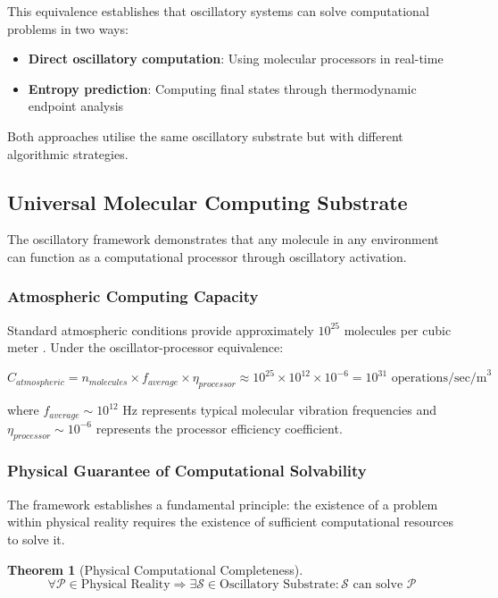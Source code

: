 \documentclass[12pt,a4paper]{article}
\newtheorem{theorem}{Theorem}
\begin{document}
This equivalence establishes that oscillatory systems can solve computational problems in two ways:
\begin{itemize}
\item \textbf{Direct oscillatory computation}: Using molecular processors in real-time
\item \textbf{Entropy prediction}: Computing final states through thermodynamic endpoint analysis
\end{itemize}

Both approaches utilise the same oscillatory substrate but with different algorithmic strategies.

\subsection{Universal Molecular Computing Substrate}

The oscillatory framework demonstrates that any molecule in any environment can function as a computational processor through oscillatory activation.

\subsubsection{Atmospheric Computing Capacity}

Standard atmospheric conditions provide approximately $10^{25}$ molecules per cubic meter \cite{lloyd2000ultimate}. Under the oscillator-processor equivalence:

\begin{equation}
C_{atmospheric} = n_{molecules} \times f_{average} \times \eta_{processor} \approx 10^{25} \times 10^{12} \times 10^{-6} = 10^{31} \text{ operations/sec/m}^3
\end{equation}

where $f_{average} \sim 10^{12}$ Hz represents typical molecular vibration frequencies and $\eta_{processor} \sim 10^{-6}$ represents the processor efficiency coefficient.

\subsubsection{Physical Guarantee of Computational Solvability}

The framework establishes a fundamental principle: the existence of a problem within physical reality requires the existence of sufficient computational resources to solve it.

\begin{theorem}[Physical Computational Completeness]
\begin{equation}
\forall \mathcal{P} \in \text{Physical Reality} \Rightarrow \exists \mathcal{S} \in \text{Oscillatory Substrate} : \mathcal{S} \text{ can solve } \mathcal{P}
\end{equation}
\end{theorem}
\end{document}
